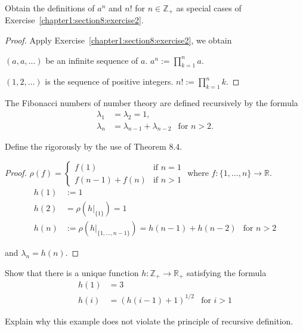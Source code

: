 \begin{exercise}\label{chapter1:section8:exercise3}
    Obtain the definitions of $a^{n}$ and $n{!}$ for $n\in\mathbb{Z}_{+}$ as special cases of Exercise~\ref{chapter1:section8:exercise2}.
\end{exercise}

\begin{proof}
    Apply Exercise~\ref{chapter1:section8:exercise2}, we obtain

    $(a, a, \ldots)$ be an infinite sequence of $a$. $a^{n} := \prod^{n}_{k=1}a$.

    $(1, 2, \ldots)$ is the sequence of positive integers. $n! := \prod^{n}_{k=1}k$.
\end{proof}

\begin{exercise}\label{chapter1:section8:exercise4}
    The Fibonacci numbers of number theory are defined recursively by the formula
    \begin{align*}
        \lambda_{1} & = \lambda_{2} = 1,                                    \\
        \lambda_{n} & = \lambda_{n-1} + \lambda_{n-2} & \text{for $n > 2$}.
    \end{align*}

    Define the rigorously by the use of Theorem 8.4.
\end{exercise}

\begin{proof}
    $\rho(f) = \begin{cases}f(1) & \text{if $n = 1$} \\ f(n - 1) + f(n) & \text{if $n > 1$} \end{cases}$ where $f: \{ 1,\ldots, n \}\to \mathbb{R}$.
    \begin{align*}
        h(1) & := 1                                                                         \\
        h(2) & = \rho(h\vert_{\{1\}}) = 1                                                   \\
        h(n) & := \rho(h\vert_{\{ 1,\ldots, n-1 \}}) = h(n-1) + h(n-2) & \text{for $n > 2$}
    \end{align*}

    and $\lambda_{n} = h(n)$.
\end{proof}

\begin{exercise}\label{chapter1:section8:exercise5}
    Show that there is a unique function $h: \mathbb{Z}_{+}\to\mathbb{R}_{+}$ satisfying the formula
    \begin{align*}
        h(1) & = 3                                           \\
        h(i) & = {(h(i - 1) + 1)}^{1/2} & \text{for $i > 1$}
    \end{align*}

    Explain why this example does not violate the principle of recursive definition.
\end{exercise}

